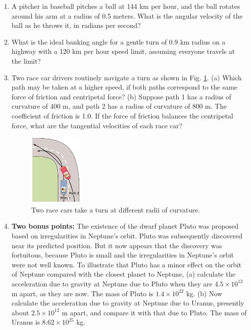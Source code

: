 \documentclass[10pt]{article}
\begin{document}
\begin{enumerate}
\item  A pitcher in baseball pitches a ball at 144 km per hour, and the ball rotates around his arm at a radius of 0.5 meters.  What is the angular velocity of the ball as he throws it, in radians per second? \\ \vspace{1cm}
\item What is the ideal banking angle for a gentle turn of 0.9 km radius on a highway with a 120 km per hour speed limit, assuming everyone travels at the limit? \\ \vspace{2cm}
\item Two race car drivers routinely navigate a turn as shown in Fig. \ref{fig:race}.  (a) Which path may be taken at a higher speed, if both paths correspond to the same force of friction and centripetal force? (b) Suppose path 1 has a radius of curvature of 400 m, and path 2 has a radius of curvature of 800 m.  The coefficient of friction is 1.0.  If the force of friction balances the centripetal force, what are the tangential velocities of each race car? \\ \vspace{1cm}
\begin{figure}[ht]
\centering
\includegraphics[width=0.25\textwidth]{race.png}
\caption{\label{fig:race} Two race cars take a turn at different radii of curvature.}
\end{figure}
\item \textbf{Two bonus points:} The existence of the dwarf planet Pluto was proposed based on irregularities in Neptune’s orbit. Pluto was subsequently discovered near its predicted position. But it now appears that the discovery was fortuitous, because Pluto is small and the irregularities in Neptune’s orbit were not well known. To illustrate that Pluto has a minor effect on the orbit of Neptune compared with the closest planet to Neptune, (a) calculate the acceleration due to gravity at Neptune due to Pluto when they are $4.5 \times 10^{12}$ m apart, as they are now.  The mass of Pluto is $1.4 \times 10^{22}$ kg.  (b) Now calculate the acceleration due to gravity at Neptune due to Uranus, presently about $2.5 \times 10^{12}$ m apart, and compare it with that due to Pluto.  The mass of Uranus is $8.62 \times 10^{25}$ kg. \\ \vspace{1cm}
\end{enumerate}
\end{document}
